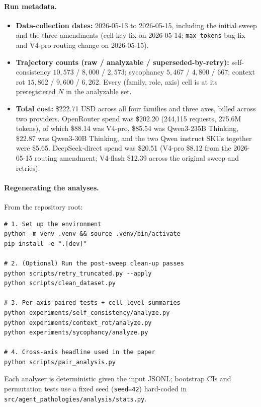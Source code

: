 \paragraph{Run metadata.}
\begin{itemize}
  \item \textbf{Data-collection dates:} 2026-05-13 to 2026-05-15,
        including the initial sweep and the three amendments (cell-key
        fix on 2026-05-14; \texttt{max\_tokens} bug-fix and V4-pro
        routing change on 2026-05-15).
  \item \textbf{Trajectory counts (raw / analyzable / superseded-by-retry):}
        self-consistency $10{,}573$ / $8{,}000$ / $2{,}573$;
        sycophancy $5{,}467$ / $4{,}800$ / $667$;
        context rot $15{,}862$ / $9{,}600$ / $6{,}262$. Every
        (family, role, axis) cell is at its preregistered $N$ in the
        analyzable set.
  \item \textbf{Total cost:} \$222.71 USD across all four families
        and three axes, billed across two providers. OpenRouter
        spend was \$202.20 (244{,}115 requests, 275.6M tokens), of
        which \$88.14 was V4-pro, \$85.54 was Qwen3-235B Thinking,
        \$22.87 was Qwen3-30B Thinking, and the two Qwen instruct
        SKUs together were \$5.65. DeepSeek-direct spend was
        \$20.51 (V4-pro \$8.12 from the 2026-05-15 routing
        amendment; V4-flash \$12.39 across the original sweep and
        retries).
\end{itemize}

\paragraph{Regenerating the analyses.}
From the repository root:
\begin{verbatim}
# 1. Set up the environment
python -m venv .venv && source .venv/bin/activate
pip install -e ".[dev]"

# 2. (Optional) Run the post-sweep clean-up passes
python scripts/retry_truncated.py --apply
python scripts/clean_dataset.py

# 3. Per-axis paired tests + cell-level summaries
python experiments/self_consistency/analyze.py
python experiments/context_rot/analyze.py
python experiments/sycophancy/analyze.py

# 4. Cross-axis headline used in the paper
python scripts/pair_analysis.py
\end{verbatim}
Each analyser is deterministic given the input JSONL; bootstrap CIs and
permutation tests use a fixed seed (\texttt{seed=42}) hard-coded in
\texttt{src/agent\_pathologies/analysis/stats.py}.

